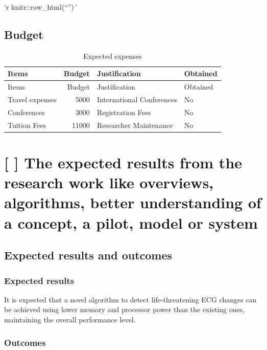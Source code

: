 \documentclass[runningheads]{llncs}
\begin{document}
`r knitr::raw\_html(``'')´

\hypertarget{budget}{%
\subsection{Budget}\label{budget}}

\begin{longtable}[]{@{}lrll@{}}
\caption{Expected expenses}\tabularnewline
\toprule
Items & Budget & Justification & Obtained \\
\midrule
\endfirsthead
\toprule
Items & Budget & Justification & Obtained \\
\midrule
\endhead
Travel expenses & 5000 & International Conferences & No \\
Conferences & 3000 & Registration Fees & No \\
Tuition Fees & 11000 & Researcher Maintenance & No \\
\bottomrule
\end{longtable}

\hypertarget{the-expected-results-from-the-research-work-like-overviews-algorithms-better-understanding-of-a-concept-a-pilot-model-or-system}{%
\section{{[} {]} The expected results from the research work like
overviews, algorithms, better understanding of a concept, a pilot, model
or
system}\label{the-expected-results-from-the-research-work-like-overviews-algorithms-better-understanding-of-a-concept-a-pilot-model-or-system}}

\hypertarget{expected-results-and-outcomes}{%
\subsection{Expected results and
outcomes}\label{expected-results-and-outcomes}}

\hypertarget{expected-results}{%
\subsubsection{Expected results}\label{expected-results}}

It is expected that a novel algorithm to detect life-threatening ECG
changes can be achieved using lower memory and processor power than the
existing ones, maintaining the overall performance level.

\hypertarget{outcomes}{%
\subsubsection{Outcomes}\label{outcomes}}
\end{document}
